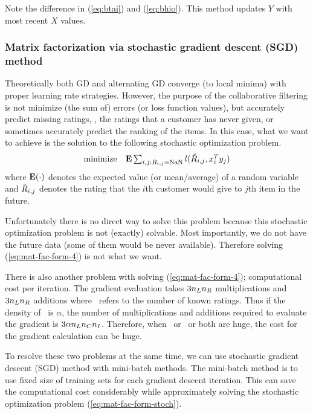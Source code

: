 Note the difference in (\ref{eq:btai}) and (\ref{eq:bhio}).
This method updates $Y$ with most recent $X$ values.

\subsubsection{Matrix factorization via stochastic gradient descent (SGD) method}

Theoretically both GD and alternating GD converge (to local minima) with proper learning rate strategies.
However, the purpose of the collaborative filtering is not minimize (the sum of) errors (or loss function values),
but accurately predict missing ratings, \ie, the ratings that a customer has never given,
or sometimes accurately predict the ranking of the items.
In this case, what we want to achieve is the solution to the following stochastic optimization problem.
\begin{equation}
\label{eq:mat-fac-form-stoch}
\begin{array}{ll}
\mbox{minimize} & \mathbf{E} \sum_{i,j:R_{i,j} = \mathrm{NaN}} l(\tilde{R}_{i,j}, x_i^T y_j)
\end{array}
\end{equation}
where $\mathbf{E}(\cdot)$ denotes the expected value (or mean/average) of a random variable
and $\tilde{R}_{i,j}$ denotes the rating that the $i$th customer would give to $j$th item in the future.

Unfortunately there is no direct way to solve this problem
because this stochastic optimization problem is not (exactly) solvable.
Most importantly, we do not have the future data (some of them would be never available).
Therefore solving (\ref{eq:mat-fac-form-4}) is not what we want.

There is also another problem with solving (\ref{eq:mat-fac-form-4}); computational cost per iteration.
The gradient evaluation takes $3{n_L} {n_R}$ multiplications and $3{n_L} {n_R}$ additions
where \numrating\ refers to the number of known ratings.
Thus if the density of \ratmat\ is $\alpha$, the number of multiplications and additions required to evaluate the gradient
is $3\alpha {n_L} {n_C} {n_I}$.
Therefore, when \numcus\ or \numitem\ or both are huge, the cost for the gradient calculation can be huge.


To resolve these two problems at the same time, we can use stochastic gradient descent (SGD) method with mini-batch methods.
The mini-batch method is to use fixed size of training sets for each gradient descent iteration.
This can save the computational cost considerably while approximately solving the stochastic optimization problem (\ref{eq:mat-fac-form-stoch}).



